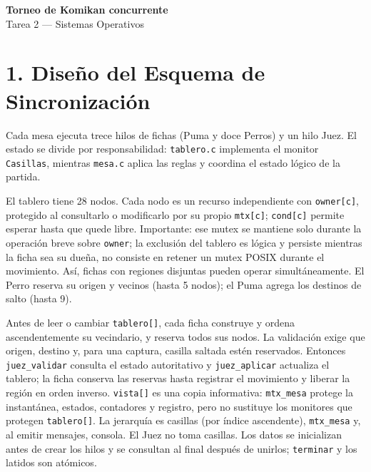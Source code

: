 \documentclass[10pt]{article}
\begin{document}
\begin{center}
{\large\bfseries Torneo de Komikan concurrente}\\[-1pt]
{\small Tarea 2 --- Sistemas Operativos}
\end{center}
\vspace{-5pt}

\section*{1. Diseño del Esquema de Sincronización}
Cada mesa ejecuta trece hilos de fichas (Puma y doce Perros) y un hilo Juez.
El estado se divide por responsabilidad: \texttt{tablero.c} implementa el
monitor \texttt{Casillas}, mientras \texttt{mesa.c} aplica las reglas y
coordina el estado lógico de la partida.

El tablero tiene 28 nodos. Cada nodo es un recurso independiente con
\texttt{owner[c]}, protegido al consultarlo o modificarlo por su propio
\texttt{mtx[c]}; \texttt{cond[c]} permite esperar hasta que quede libre.
Importante: ese mutex se mantiene solo durante la operación breve sobre
\texttt{owner}; la exclusión del tablero es lógica y persiste mientras la ficha
sea su dueña, no consiste en retener un mutex POSIX durante el movimiento.
Así, fichas con regiones disjuntas pueden operar simultáneamente. El Perro
reserva su origen y vecinos (hasta 5 nodos); el Puma agrega los destinos de
salto (hasta 9).

Antes de leer o cambiar \texttt{tablero[]}, cada ficha construye y ordena
ascendentemente su vecindario, y reserva todos sus nodos. La validación exige
que origen, destino y, para una captura, casilla saltada estén reservados.
Entonces \texttt{juez\_validar} consulta el estado autoritativo y
\texttt{juez\_aplicar} actualiza el tablero; la ficha conserva las reservas
hasta registrar el movimiento y liberar la región en orden inverso.
\texttt{vista[]} es una copia informativa: \texttt{mtx\_mesa} protege la
instantánea, estados, contadores y registro, pero no sustituye los monitores
que protegen \texttt{tablero[]}. La jerarquía es casillas (por índice
ascendente), \texttt{mtx\_mesa} y, al emitir mensajes, consola. El Juez no toma
casillas. Los datos se inicializan antes de crear los hilos y se consultan al
final después de unirlos; \texttt{terminar} y los latidos son atómicos.
\end{document}
